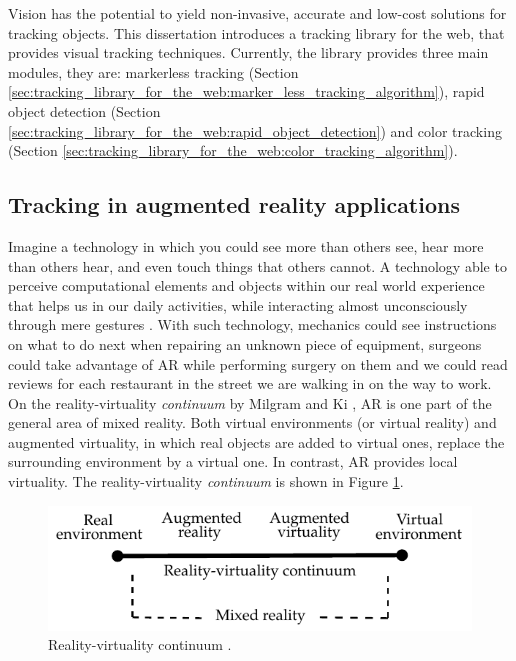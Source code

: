 Vision has the potential to yield non-invasive, accurate and low-cost solutions for tracking objects. This dissertation introduces a tracking library for the web, that provides visual tracking techniques. Currently, the library provides three main modules, they are: markerless tracking (Section \ref{sec:tracking_library_for_the_web:marker_less_tracking_algorithm}), rapid object detection (Section \ref{sec:tracking_library_for_the_web:rapid_object_detection}) and color tracking (Section \ref{sec:tracking_library_for_the_web:color_tracking_algorithm}).


\subsection{Tracking in augmented reality applications} %
\label{sub:basic_concepts:visual_tracking:tracking_in_augmented_reality_applications}

Imagine a technology in which you could see more than others see, hear more than others hear, and even touch things that others cannot. A technology able to perceive computational elements and objects within our real world experience that helps us in our daily activities, while interacting almost unconsciously through mere gestures \cite{Krevelen2010,Teichrieb2007}. With such technology, mechanics could see instructions on what to do next when repairing an unknown piece of equipment, surgeons could take advantage of AR while performing surgery on them and we could read reviews for each restaurant in the street we are walking in on the way to work. On the reality-virtuality \textit{continuum} by Milgram and Ki \cite{Mistry2009}, AR is one part of the general area of mixed reality. Both virtual environments (or virtual reality) and augmented virtuality, in which real objects are added to virtual ones, replace the surrounding environment by a virtual one. In contrast, AR provides local virtuality. The reality-virtuality \textit{continuum} is shown in Figure \ref{figure:reality_continuum}.

\begin{figure}[!htb]
  \centering
  \includegraphics{chapters/basic_concepts/reality_continuum.pdf}
  \caption{Reality-virtuality continuum \cite{Benford1998}.}
  \label{figure:reality_continuum}
\end{figure}

